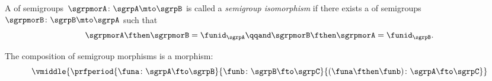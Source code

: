 \begin{ctdefinition}
	\label{def:semigroup-iso}
	A \whomo of semigroups~$\sgrpmorA\colon \sgrpA \mto \sgrpB$ is called a \emph{semigroup isomorphism} if there exists a \whomo of semigroups~$\sgrpmorB\colon \sgrpB \mto \sgrpA$ such that
	\begin{equation}
		\label{eq:sgrp-iso-cond}
		\sgrpmorA \fthen \sgrpmorB = \funid_\sgrpA
		\qqand
		\sgrpmorB \fthen \sgrpmorA = \funid_\sgrpB.
	\end{equation}
\end{ctdefinition}

\begin{lemma}
	\label{lem:semigroup-morphisms-compose}
	The composition of semigroup morphisms is a morphism:
	\begin{equation}
		\label{eq:sgrp-mor-compo}
		\vmiddle{
			\prfperiod{
				\funa  \colon \sgrpA \fto \sgrpB
			}{
				\funb \colon  \sgrpB \fto \sgrpC
			}{
				(\funa \fthen \funb)  \colon \sgrpA \fto \sgrpC
			}
		}
	\end{equation}
\end{lemma}

